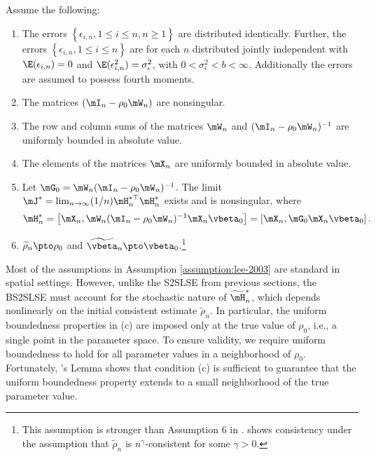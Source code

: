 \begin{assumption}\label{assumption:lee-2003}
Assume the following:
\begin{enumerate}
\item The errors  $\left\lbrace \epsilon_{i,n}, 1 \leq i \leq n, n\geq 1\right\rbrace$ are distributed identically. Further, the errors $\left\lbrace \epsilon_{i,n}, 1 \leq i \leq n\right\rbrace$ are for each $n$ distributed jointly independent with  $\E(\epsilon_{i,n})= 0$ and $\E(\epsilon_{i,n}^2) = \sigma^2_{\epsilon}$, with $0 < \sigma^2_{\epsilon}  < b <\infty$. Additionally the errors are assumed to possess fourth moments.
  \item The matrices $(\mI_n - \rho_0\mW_n)$ are nonsingular. 
  \item The row and column sums of the matrices $\mW_n$ and $(\mI_n - \rho_0\mW_n)^{-1}$ are uniformly bounded in absolute value. 
  \item The elements of the matrices $\mX_n$ are uniformly bounded in absolute value. 
  \item Let $\mG_0 = \mW_n(\mI_n - \rho_0\mW_n)^{-1}$. The limit $\mJ^* = \lim_{n \to \infty}(1/n)\mH_n^{*\top}\mH_n^{*}$ exists and is nonsingular, where
  \begin{equation*}
    \mH_n^* = \left[\mX_n, \mW_n(\mI_n - \rho_0\mW_n)^{-1}\mX_n\vbeta_0\right] = \left[\mX_n, \mG_0\mX_n\vbeta_0\right].
  \end{equation*}
  \item $\widetilde{\rho}_n\pto \rho_0$ and $\widetilde{\vbeta}_n \pto \vbeta_0$.\footnote{This assumption is stronger than Assumption 6 in \cite{lee2003best}. \cite{lee2003best} shows consistency under the assumption that $\widetilde{\rho}_n$ is $n^\gamma$-consistent for some $\gamma>0$.}
\end{enumerate}  
\end{assumption}

Most of the assumptions in Assumption \ref{assumption:lee-2003} are standard in spatial settings. However, unlike the S2SLSE from previous sections, the BS2SLSE must account for the stochastic nature of $\widetilde{\mH}^{*}_n$, which depends nonlinearly on the initial consistent estimate $\widetilde{\rho}_n$. In particular, the uniform boundedness properties in (c) are imposed only at the true value of $\rho_0$, i.e., a single point in the parameter space. To ensure validity, we require uniform boundedness to hold for all parameter values in a neighborhood of $\rho_0$. Fortunately, \citet[pag. 313][]{lee2003best}'s Lemma shows that condition (c) is sufficient to guarantee that the uniform boundedness property extends to a small neighborhood of the true parameter value. 

